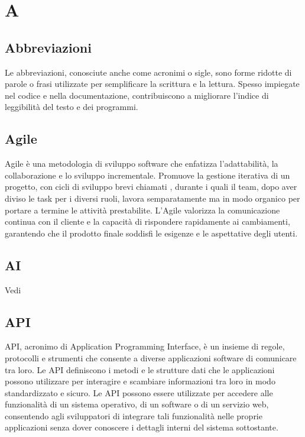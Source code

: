\section{A}

\vspace{2em}
\subsection*{Abbreviazioni}
\par Le abbreviazioni, conosciute anche come acronimi o sigle, sono forme ridotte di parole o frasi utilizzate per semplificare la scrittura e la lettura. Spesso impiegate nel codice e nella documentazione, contribuiscono a migliorare l'indice di leggibilità del testo e dei programmi.

\vspace{2em}
\subsection*{Agile}
\par Agile è una metodologia di sviluppo software che enfatizza l'adattabilità, la collaborazione e lo sviluppo incrementale. Promuove la gestione iterativa di un progetto, con cicli di sviluppo brevi chiamati , durante i quali il team, dopo aver diviso le task per i diversi ruoli, lavora semparatamente ma in modo organico per portare a termine le attività prestabilite. L'Agile valorizza la comunicazione continua con il cliente e la capacità di rispondere rapidamente ai cambiamenti, garantendo che il prodotto finale soddisfi le esigenze e le aspettative degli utenti.

\vspace{2em}
\subsection*{AI}
\par Vedi 

\vspace{2em}
\subsection*{API}
\par API, acronimo di Application Programming Interface, è un insieme di regole, protocolli e strumenti che consente a diverse applicazioni software di comunicare tra loro. Le API definiscono i metodi e le strutture dati che le applicazioni possono utilizzare per interagire e scambiare informazioni tra loro in modo standardizzato e sicuro. Le API possono essere utilizzate per accedere alle funzionalità di un sistema operativo, di un software o di un servizio web, consentendo agli sviluppatori di integrare tali funzionalità nelle proprie applicazioni senza dover conoscere i dettagli interni del sistema sottostante.

